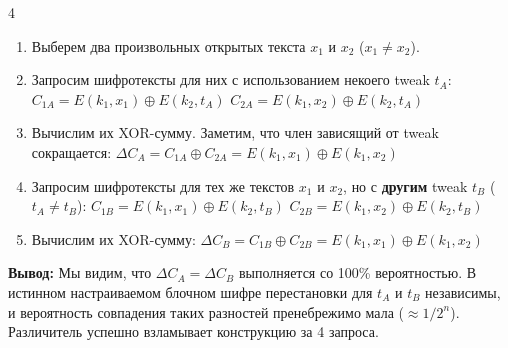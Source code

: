 ﻿\documentclass[8pt,a4paper,landscape]{extarticle}
\newcommand{\tightlist}{}
\begin{document}
\begin{multicols*}{4}
\begin{enumerate}
\def\labelenumi{\arabic{enumi}.}
\tightlist
\item
  Выберем два произвольных открытых текста \(x_1\) и \(x_2\) (\(x_1 \neq x_2\)).
\item
  Запросим шифротексты для них с использованием некоего tweak \(t_A\): \(C_{1A} = E(k_1, x_1) \oplus E(k_2, t_A)\) \(C_{2A} = E(k_1, x_2) \oplus E(k_2, t_A)\)
\item
  Вычислим их XOR-сумму. Заметим, что член зависящий от tweak сокращается: \(\Delta C_A = C_{1A} \oplus C_{2A} = E(k_1, x_1) \oplus E(k_1, x_2)\)
\item
  Запросим шифротексты для тех же текстов \(x_1\) и \(x_2\), но с \textbf{другим} tweak \(t_B\) (\(t_A \neq t_B\)): \(C_{1B} = E(k_1, x_1) \oplus E(k_2, t_B)\) \(C_{2B} = E(k_1, x_2) \oplus E(k_2, t_B)\)
\item
  Вычислим их XOR-сумму: \(\Delta C_B = C_{1B} \oplus C_{2B} = E(k_1, x_1) \oplus E(k_1, x_2)\)
\end{enumerate}

\textbf{Вывод:} Мы видим, что \(\Delta C_A = \Delta C_B\) выполняется со 100\% вероятностью. В истинном настраиваемом блочном шифре перестановки для \(t_A\) и \(t_B\) независимы, и вероятность совпадения таких разностей пренебрежимо мала (\(\approx 1/2^n\)). Различитель успешно взламывает конструкцию за 4 запроса.

\end{multicols*}
\end{document}
